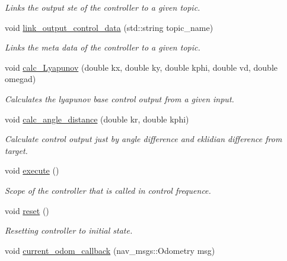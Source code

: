 \begin{DoxyCompactItemize}
\begin{DoxyCompactList}\small\item\em Links the output ste of the controller to a given topic. \end{DoxyCompactList}\item 
void \hyperlink{classController_abc1909639580e5359228c87fbd3a622b}{link\+\_\+output\+\_\+control\+\_\+data} (std\+::string topic\+\_\+name)
\begin{DoxyCompactList}\small\item\em Links the meta data of the controller to a given topic. \end{DoxyCompactList}\item 
void \hyperlink{classController_a56568ee07bb72983576e9d7c10eb3e83}{calc\+\_\+\+Lyapunov} (double kx, double ky, double kphi, double vd, double omegad)
\begin{DoxyCompactList}\small\item\em Calculates the lyapunov base control output from a given input. \end{DoxyCompactList}\item 
void \hyperlink{classController_a63249412728814430174c740d358a5c0}{calc\+\_\+angle\+\_\+distance} (double kr, double kphi)
\begin{DoxyCompactList}\small\item\em Calculate control output just by angle difference and eklidian difference from target. \end{DoxyCompactList}\item 
void \hyperlink{classController_a6661eb7307219216a7cb0a90e2a07e4d}{execute} ()\hypertarget{classController_a6661eb7307219216a7cb0a90e2a07e4d}{}\label{classController_a6661eb7307219216a7cb0a90e2a07e4d}

\begin{DoxyCompactList}\small\item\em Scope of the controller that is called in control frequence. \end{DoxyCompactList}\item 
void \hyperlink{classController_ab5515748f1b0c82f015e039c817ee5f7}{reset} ()\hypertarget{classController_ab5515748f1b0c82f015e039c817ee5f7}{}\label{classController_ab5515748f1b0c82f015e039c817ee5f7}

\begin{DoxyCompactList}\small\item\em Resetting controller to initial state. \end{DoxyCompactList}\item 
void \hyperlink{classController_a35b38608f67e7c1c34f6b7186db32ad7}{current\+\_\+odom\+\_\+callback} (nav\+\_\+msgs\+::\+Odometry msg)\hypertarget{classController_a35b38608f67e7c1c34f6b7186db32ad7}{}\label{classController_a35b38608f67e7c1c34f6b7186db32ad7}


\end{DoxyCompactItemize}
